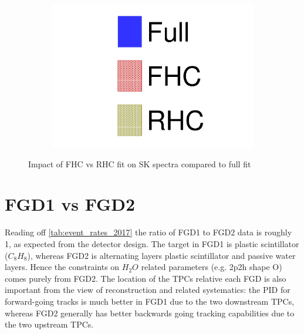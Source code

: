 \begin{figure}[h]
\begin{subfigure}[t]{0.32\textwidth}
		\includegraphics[width=\textwidth, trim={0mm 0mm 0mm 0mm}, clip, page=6]{figures/mach3/data/alt/try_2017_fit_on_sk_spectra_posterior_sk_error_run2to4_spectra_posterior_sk_error_run5to6_spectra}
	\end{subfigure}
	
	\caption{Impact of FHC vs RHC fit on SK spectra compared to full fit}
	\label{fig:sk_fhcvsrhc}
\end{figure}

\section{FGD1 vs FGD2}
Reading off \autoref{tab:event_rates_2017} the ratio of FGD1 to FGD2 data is roughly 1, as expected from the detector design. The target in FGD1 is plastic scintillator ($C_8H_8$), whereas FGD2 is alternating layers plastic scintillator and passive water layers. Hence the constraints on $H_2O$ related parameters (e.g. 2p2h shape O) comes purely from FGD2. The location of the TPCs relative each FGD is also important from the view of reconstruction and related systematics: the PID for forward-going tracks is much better in FGD1 due to the two downstream TPCs, whereas FGD2 generally has better backwards going tracking capabilities due to the two upstream TPCs.

